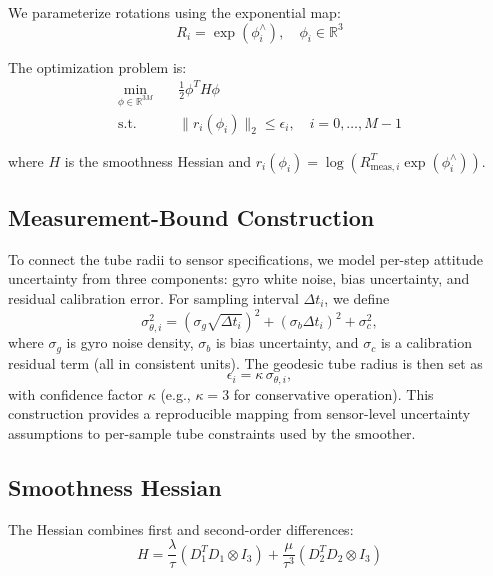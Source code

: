 \documentclass[letterpaper, 10 pt, conference]{ieeeconf}
\begin{document}
We parameterize rotations using the exponential map:
\begin{equation}
R_i = \exp(\phi_i^\wedge), \quad \phi_i \in \mathbb{R}^3
\end{equation}

The optimization problem is:
\begin{align}
\min_{\phi \in \mathbb{R}^{3M}} \quad & \frac{1}{2} \phi^T H \phi \label{eq:objective} \\
\text{s.t.} \quad & \|r_i(\phi_i)\|_2 \leq \epsilon_i, \quad i = 0, \ldots, M-1 \nonumber
\end{align}

where $H$ is the smoothness Hessian and $r_i(\phi_i) = \log(R_{\text{meas},i}^T \exp(\phi_i^\wedge))$.

\subsection{Measurement-Bound Construction}

To connect the tube radii to sensor specifications, we model per-step attitude uncertainty from three components: gyro white noise, bias uncertainty, and residual calibration error. For sampling interval $\Delta t_i$, we define
\begin{equation}
\sigma_{\theta,i}^2
=
(\sigma_g \sqrt{\Delta t_i})^2
+
(\sigma_b \Delta t_i)^2
+
\sigma_c^2,
\end{equation}
where $\sigma_g$ is gyro noise density, $\sigma_b$ is bias uncertainty, and $\sigma_c$ is a calibration residual term (all in consistent units). The geodesic tube radius is then set as
\begin{equation}
\epsilon_i
=
\kappa\,\sigma_{\theta,i},
\end{equation}
with confidence factor $\kappa$ (e.g., $\kappa=3$ for conservative operation). This construction provides a reproducible mapping from sensor-level uncertainty assumptions to per-sample tube constraints used by the smoother.

\subsection{Smoothness Hessian}

The Hessian combines first and second-order differences:
\begin{equation}
H = \frac{\lambda}{\tau} (D_1^T D_1 \otimes I_3) + \frac{\mu}{\tau^3} (D_2^T D_2 \otimes I_3)
\end{equation}
\end{document}
